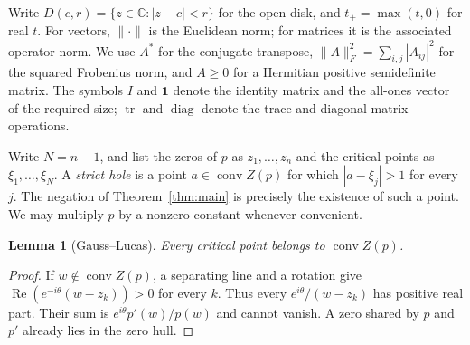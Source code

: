 \documentclass[11pt,reqno]{amsart}
\numberwithin{equation}{section}
\newtheorem{lemma}[theorem]{Lemma}
\theoremstyle{definition}
\theoremstyle{remark}
\DeclareMathOperator{\conv}{conv}
\DeclareMathOperator{\tr}{tr}
\DeclareMathOperator{\diag}{diag}
\renewcommand{\Re}{\operatorname{Re}}
\newcommand{\C}{\mathbb C}
\begin{document}
Write $D(c,r)=\{z\in\C:|z-c|<r\}$ for the open disk, and
$t_+=\max(t,0)$ for real $t$.
For vectors, $\|\cdot\|$ is the Euclidean norm; for matrices it is
the associated operator norm. We use $A^*$ for the conjugate transpose,
$\|A\|_F^2=\sum_{i,j}|A_{ij}|^2$ for the squared Frobenius norm,
and $A\ge0$ for a Hermitian positive semidefinite matrix.
The symbols $I$ and $\mathbf1$ denote the identity matrix and the
all-ones vector of the required size; $\tr$ and $\diag$ denote
the trace and diagonal-matrix operations.

Write $N=n-1$, and list the zeros of $p$ as $z_1,\ldots,z_n$ and
the critical points as $\xi_1,\ldots,\xi_N$. A \emph{strict hole}
is a point $a\in\conv Z(p)$ for which $|a-\xi_j|>1$ for every $j$.
The negation of Theorem~\ref{thm:main} is precisely the existence of
such a point. We may multiply $p$ by a nonzero constant whenever
convenient.

\begin{lemma}[Gauss--Lucas]\label{pr:gauss-lucas}
Every critical point belongs to $\conv Z(p)$.
\end{lemma}
\begin{proof}
If $w\notin\conv Z(p)$, a separating line and a rotation give
$\Re(e^{-i\theta}(w-z_k))>0$ for every $k$. Thus every
$e^{i\theta}/(w-z_k)$ has positive real part. Their sum is
$e^{i\theta}p'(w)/p(w)$ and cannot vanish. A zero shared by $p$
and $p'$ already lies in the zero hull.
\end{proof}
\end{document}
